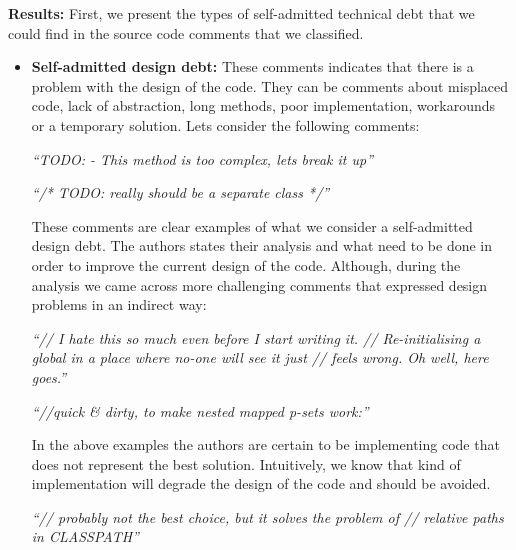 \vspace{1mm}
\noindent\textbf{Results:} First, we present the types of self-admitted technical debt that we could find in the source code comments that we classified. 

\begin{itemize}
  \item \textbf{Self-admitted design debt:} These comments indicates that there is a problem with the design of the code. They can be comments about misplaced code, lack of abstraction, long methods, poor implementation, workarounds or a temporary solution. Lets consider the following comments:
  
  \vspace{1mm}
  \begin{displayquote}
     \textit{``TODO: - This method is too complex, lets break it up''}
     
     \vspace{1mm}

     \textit{``/* TODO: really should be a separate class */''}
  \end{displayquote}
  \vspace{1mm}

  These comments are clear examples of what we consider a self-admitted design debt. The authors states their analysis and what need to be done in order to improve the current design of the code. Although, during the analysis we came across more challenging comments that expressed design problems in an indirect way:  
  
  \vspace{1mm}
  \begin{displayquote}
     \textit{``// I hate this so much even before I start writing it. // Re-initialising a global in a place where no-one will see it just // feels wrong.  Oh well, here goes.''}

     \vspace{1mm}

     \textit{``//quick \& dirty, to make nested mapped p-sets work:''}
  \end{displayquote}
  \vspace{1mm}

  In the above examples the authors are certain to be implementing code that does not represent the best solution. Intuitively, we know that kind of implementation will degrade the design of the code and should be avoided. 

  \vspace{1mm}
  \begin{displayquote}
      \textit{``// probably not the best choice, but it solves the problem of // relative paths in CLASSPATH''}


\end{displayquote}
\end{itemize}
